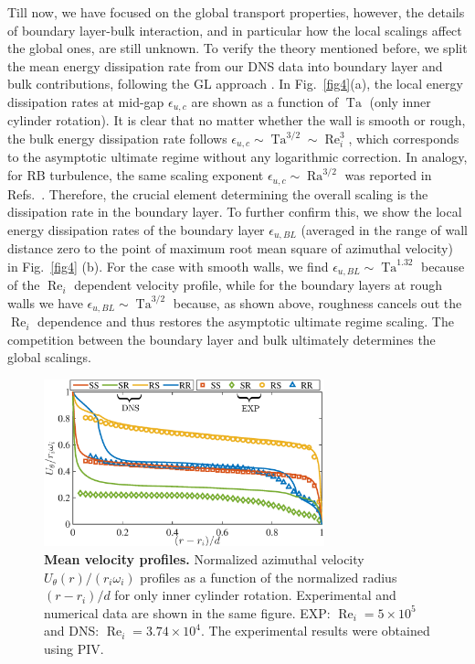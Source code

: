 \documentclass[aps,prl,superscriptaddress,preprint]{revtex4}
\renewcommand{\Re}{\operatorname{Re}}
\newcommand{\Ra}{\operatorname{Ra}}
\newcommand{\Ta}{\operatorname{Ta}}
\begin{document}
Till now, we have focused on the global transport properties, however, the details of boundary layer-bulk interaction, and in particular how the local scalings affect the global ones, are still unknown. To verify the theory mentioned before, we split the mean energy dissipation rate from our DNS data into boundary layer and bulk contributions, following the GL approach \cite{gro00,gro01}. In Fig.~\ref{fig4}(a), the local energy dissipation rates at mid-gap $\epsilon_{u,c}$  are shown as a function of $\Ta$ (only inner cylinder rotation). It is clear that no matter whether the wall is smooth or rough, the bulk energy dissipation rate follows $\epsilon_{u,c}\sim \Ta^{3/2} \sim 
\Re_i^3$, which corresponds to the asymptotic ultimate regime without any logarithmic correction. In analogy, for RB turbulence, the same scaling exponent $\epsilon_{u,c}\sim \Ra^{3/2}$ was reported in Refs.\ \cite{sha08,ni11b}. Therefore, the crucial element determining the overall scaling is the dissipation rate in the boundary layer. To further confirm this, we show the local energy dissipation rates of the boundary layer $\epsilon_{u,BL}$ (averaged in the range of wall distance zero to the point of maximum root mean square of azimuthal velocity) in Fig.~\ref{fig4} (b). For the case with smooth walls, we find $\epsilon_{u,BL} \sim \Ta^{1.32}$ because of the $\Re_i$ dependent velocity profile, while for the boundary layers at rough walls we have $\epsilon_{u,BL} \sim \Ta^{3/2}$ because, as shown above, roughness cancels out the $\Re_i$ dependence and thus restores the asymptotic ultimate regime scaling. 
The competition between the boundary layer and bulk
ultimately determines the global scalings.


\begin{figure}[!htp]
\includegraphics[width=3.2in]{4.eps}
\caption{{\bf Mean velocity profiles.} Normalized azimuthal velocity $U_{\theta}(r)/(r_i \omega_i)$ profiles as a function of the normalized radius $(r-r_i)/d$ for only inner cylinder rotation. Experimental and numerical data are shown in the same figure. EXP: $\Re_i = 5\times 10^5$ and DNS: $\Re_i = 3.74\times 10^4$. The experimental results were obtained using PIV.}
\label{fig:vel_prof}
\end{figure}
\end{document}
